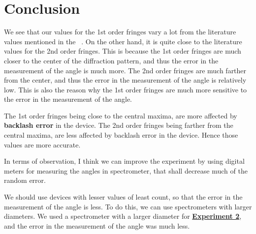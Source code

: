 \section{Conclusion}
	We see that our values for the 1st order fringes vary a lot from the literature values mentioned in the ~\cite{manual}. On the other hand, it is quite close to the literature values for the 2nd order fringes. This is because the 1st order fringes are much closer to the center of the diffraction pattern, and thus the error in the measurement of the angle is much more. The 2nd order fringes are much farther from the center, and thus the error in the measurement of the angle is relatively low. This is also the reason why the 1st order fringes are much more sensitive to the error in the measurement of the angle.

	The 1st order fringes being close to the central maxima, are more affected by \textbf{backlash error} in the device. The 2nd order fringes being farther from the central maxima, are less affected by backlash error in the device. Hence those values are more accurate.

	In terms of observation, I think we can improve the experiment by using digital meters for measuring the angles in spectrometer, that shall decrease much of the random error.

	We should use devices with lesser values of least count, so that the error in the measurement of the angle is less. To do this, we can use spectrometers with larger diameters. We used a spectrometer with a larger diameter for \href{https://github.com/PeithonKing/lab_report_Sem5/blob/main/Optics%20Lab/Expt_2/main.pdf}{\textbf{Experiment 2}}, and the error in the measurement of the angle was much less.
